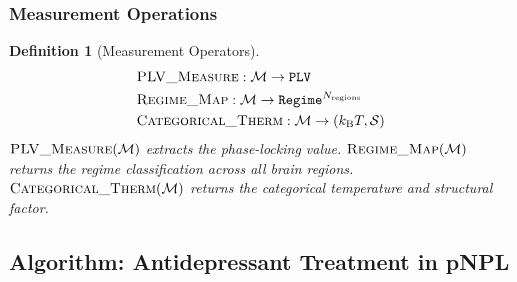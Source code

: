 \documentclass[10pt,twocolumn]{article}
\newtheorem{definition}[theorem]{Definition}
\theoremstyle{remark}
\newcommand{\kB}{k_{\mathrm{B}}}
\newcommand{\Mstate}{\mathcal{M}}
\begin{document}
\subsubsection{Measurement Operations}

\begin{definition}[Measurement Operators]
\label{def:meas_ops}
\begin{align}
&\textsc{PLV\_Measure} : \Mstate \to \texttt{PLV} \notag \\
&\textsc{Regime\_Map} : \Mstate \to \texttt{Regime}^{N_{\mathrm{regions}}} \notag \\
&\textsc{Categorical\_Therm} : \Mstate \to (\kB T, \mathcal{S}) \notag
\end{align}
$\textsc{PLV\_Measure}(\Mstate)$ extracts the phase-locking value. $\textsc{Regime\_Map}(\Mstate)$ returns the regime classification across all brain regions. $\textsc{Categorical\_Therm}(\Mstate)$ returns the categorical temperature and structural factor.
\end{definition}

\subsection{Algorithm: Antidepressant Treatment in pNPL}
\end{document}
